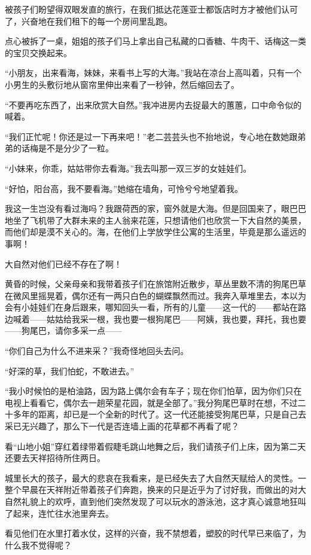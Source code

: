 \par 被孩子们盼望得双眼发直的旅行，在我们抵达花莲亚士都饭店时方才被他们认可了，兴奋地在我们租下的每一个房间里乱跑。
\par 点心被拆了一桌，姐姐的孩子们马上拿出自己私藏的口香糖、牛肉干、话梅这一类的宝贝交换起来。
\par “小朋友，出来看海，妹妹，来看书上写的大海。”我站在凉台上高叫着，只有一个小男生的头敷衍地从窗帘里伸出来看了一秒钟，然后缩回去了。
\par “不要再吃东西了，出来欣赏大自然。”我冲进房内去捉最大的蕙蕙，口中命令似的喊着。
\par “我们正忙呢！你还是过一下再来吧！”老二芸芸头也不抬地说，专心地在数她跟弟弟的话梅是不是分少了一粒。
\par “小妹来，你乖，姑姑带你去看海。”我去叫那一双三岁的女娃娃们。
\par “好怕，阳台高，我不要看海。”她缩在墙角，可怜兮兮地望着我。
\par 我这一生岂没有看过海吗？我跟荷西的家，窗外就是大海。但是回国来了，眼巴巴地坐了飞机带了大群未来的主人翁来花莲，只想请他们也欣赏一下大自然的美景，而他们却是漠不关心的。海，在他们上学放学住公寓的生活里，毕竟是那么遥远的事啊！
\par 大自然对他们已经不存在了啊！
\par 黄昏的时候，父亲母亲和我带着孩子们在旅馆附近散步，草丛里数不清的狗尾巴草在微风里摇晃着，偶尔还有一两只白色的蝴蝶飘然而过。我奔入草堆里去，本以为会有小娃娃们在身后跟来，哪知回头一看，所有的儿童——这一代的——都站在路边喊着——姑姑给我采一根，我也要一根狗尾巴——阿姨，我也要，拜托，我也要——狗尾巴，请你多采一点——
\par “你们自己为什么不进来采？”我奇怪地回头去问。
\par “好深的草，我们怕蛇，不敢进去。”
\par “我小时候怕的是柏油路，因为路上偶尔会有车子；现在你们怕草，因为你们只在电视上看看它，偶尔去一趟荣星花园，就是全部了。”我分狗尾巴草时在想，不过二十多年的距离，却已是一个全新的时代了。这一代还能接受狗尾巴草，只是自己去采已无兴趣了，那么下一代是否连墙上画的花草都不再看了呢？
\par 看“山地小姐”穿红着绿带着假睫毛跳山地舞之后，我们请孩子们上床，因为第二天还要去天祥招待所住两日。
\par 城里长大的孩子，最大的悲哀在我看来，是已经失去了大自然天赋给人的灵性。一整个早晨在天祥附近带着孩子们奔跑，换来的只是近乎为了讨好我，而做出的对大自然礼貌上的欢呼，直到他们突然发现了可以玩水的游泳池，这才真心诚意地狂叫了起来，连忙往水池里奔去。
\par 看见他们在水里打着水仗，这样的兴奋，我不禁想着，塑胶的时代早已来临了，为什么我不觉得呢？
